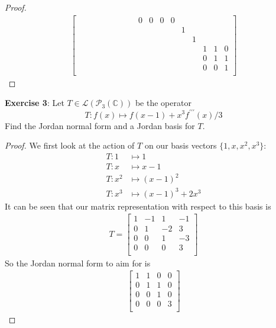 \documentclass{article}
\begin{document}
\begin{proof}
\begin{align*}
\begin{bmatrix}
                       &    &    &    &    &    &   &   &   & 0 & 0 & 0 & 0 &   &   &   &   &   \\
                       &    &    &    &    &    &   &   &   &   &   &   &   & 1 &   &   &   &   \\
                       &    &    &    &    &    &   &   &   &   &   &   &   &   & 1 &   &   &   \\
                       &    &    &    &    &    &   &   &   &   &   &   &   &   &   & 1 & 1 & 0 \\
                       &    &    &    &    &    &   &   &   &   &   &   &   &   &   & 0 & 1 & 1 \\
                       &    &    &    &    &    &   &   &   &   &   &   &   &   &   & 0 & 0 & 1 \\
                \end{bmatrix}
        \end{align*}
    \end{proof}
\textbf{Exercise 3}: Let $T \in \mathcal{L}(\mathcal{P}_{3}(\mathbb{C}))$ be the operator
    \begin{equation*}
        T : f(x) \mapsto f(x - 1) + x^{3}f^{\prime\prime\prime}(x)/3
    \end{equation*}
Find the Jordan normal form and a Jordan basis for $T$.
    \begin{proof}
        We first look at the action of $T$ on our basis vectors $\{1, x, x^{2}, x^{3}\}$:
            \begin{align*}
                T: 1 &\mapsto 1 \\
                T: x &\mapsto x - 1 \\
                T: x^{2} &\mapsto (x - 1)^{2} \\
                T: x^{3} &\mapsto (x - 1)^{3} + 2x^{3}
            \end{align*}
        It can be seen that our matrix representation with respect to this basis is 
            \begin{align*}
                T = 
                \begin{bmatrix}
                    1 & -1 & 1  & -1 \\
                    0 & 1  & -2 & 3  \\
                    0 & 0  & 1  & -3 \\
                    0 & 0  & 0  & 3  \\
                \end{bmatrix}
            \end{align*}
        So the Jordan normal form to aim for is 
            \begin{align*}
                \begin{bmatrix}
                    1 & 1 & 0 & 0 \\
                    0 & 1 & 1 & 0 \\
                    0 & 0 & 1 & 0 \\
                    0 & 0 & 0 & 3 \\
                \end{bmatrix}
            \end{align*}
    \end{proof}
\end{document}
